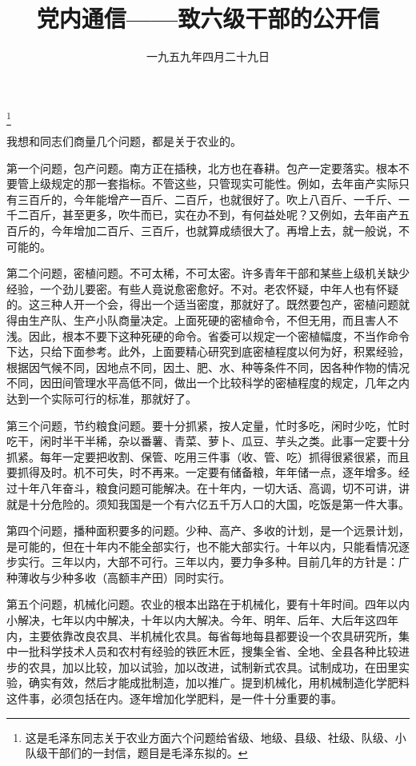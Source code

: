 
\title{党内通信——致六级干部的公开信}
\date{一九五九年四月二十九日}
\thanks{这是毛泽东同志关于农业方面六个问题给省级、地级、县级、社级、队级、小队级干部们的一封信，题目是毛泽东拟的。}
\maketitle



我想和同志们商量几个问题，都是关于农业的。

第一个问题，包产问题。南方正在插秧，北方也在春耕。包产一定要落实。根本不要管上级规定的那一套指标。不管这些，只管现实可能性。例如，去年亩产实际只有三百斤的，今年能增产一百斤、二百斤，也就很好了。吹上八百斤、一千斤、一千二百斤，甚至更多，吹牛而已，实在办不到，有何益处呢？又例如，去年亩产五百斤的，今年增加二百斤、三百斤，也就算成绩很大了。再增上去，就一般说，不可能的。

第二个问题，密植问题。不可太稀，不可太密。许多青年干部和某些上级机关缺少经验，一个劲儿要密。有些人竟说愈密愈好。不对。老农怀疑，中年人也有怀疑的。这三种人开一个会，得出一个适当密度，那就好了。既然要包产，密植问题就得由生产队、生产小队商量决定。上面死硬的密植命令，不但无用，而且害人不浅。因此，根本不要下这种死硬的命令。省委可以规定一个密植幅度，不当作命令下达，只给下面参考。此外，上面要精心研究到底密植程度以何为好，积累经验，根据因气候不同，因地点不同，因土、肥、水、种等条件不同，因各种作物的情况不同，因田间管理水平高低不同，做出一个比较科学的密植程度的规定，几年之内达到一个实际可行的标准，那就好了。

第三个问题，节约粮食问题。要十分抓紧，按人定量，忙时多吃，闲时少吃，忙时吃干，闲时半干半稀，杂以番薯、青菜、萝卜、瓜豆、芋头之类。此事一定要十分抓紧。每年一定要把收割、保管、吃用三件事（收、管、吃）抓得很紧很紧，而且要抓得及时。机不可失，时不再来。一定要有储备粮，年年储一点，逐年增多。经过十年八年奋斗，粮食问题可能解决。在十年内，一切大话、高调，切不可讲，讲就是十分危险的。须知我国是一个有六亿五千万人口的大国，吃饭是第一件大事。

第四个问题，播种面积要多的问题。少种、高产、多收的计划，是一个远景计划，是可能的，但在十年内不能全部实行，也不能大部实行。十年以内，只能看情况逐步实行。三年以内，大部不可行。三年以内，要力争多种。目前几年的方针是：广种薄收与少种多收（高额丰产田）同时实行。

第五个问题，机械化问题。农业的根本出路在于机械化，要有十年时间。四年以内小解决，七年以内中解决，十年以内大解决。今年、明年、后年、大后年这四年内，主要依靠改良农具、半机械化农具。每省每地每县都要设一个农具研究所，集中一批科学技术人员和农村有经验的铁匠木匠，搜集全省、全地、全县各种比较进步的农具，加以比较，加以试验，加以改进，试制新式农具。试制成功，在田里实验，确实有效，然后才能成批制造，加以推广。提到机械化，用机械制造化学肥料这件事，必须包括在内。逐年增加化学肥料，是一件十分重要的事。

